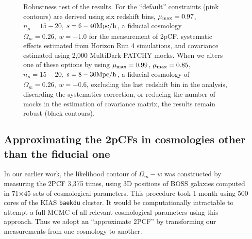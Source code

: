 \documentclass[iop]{emulateapj}
\begin{document}
\begin{figure}
   \caption{\label{fig_contest}
   Robustness test of the results.
   For the ``default'' constraints (pink contours) are derived using six redshift bins, 
   $\mu_{\rm max}=0.97$, $n_{\mu}=15-20$, $s=6-40 \rm Mpc/h$,
   a fiducial cosmology $\Omega_m=0.26,\ w=-1.0$ for the measurement of 2pCF,
   systematic effects estimated from Horizon Run 4 simulations, 
   and covariance estimated using 2,000 MultiDark PATCHY mocks.
   When we alters one of these options by using $\mu_{\rm max}=0.99$, 
   $\mu_{\rm max}=0.85$, $n_{\mu}=15-20$, $s=8-30 \rm Mpc/h$, 
   a fiducial cosmology of $\Omega_m=0.26,\ w=-0.6$, 
   excluding the last redshift bin in the analysis, 
   discarding the systematics correction, 
   or reducing the number of mocks in the estimation of covariance matrix,
   the results remain robust (black contours).
   }
\end{figure}

\subsection{Approximating the 2pCFs in cosmologies other than the fiducial one}

In our earlier work\cite{Li2016}, the likelihood contour of $\Omega_m-w$ was constructed by
measuring the 2PCF 3,375 times,
using 3D positions of BOSS galaxies computed in 71$\times$45 sets of cosmological parameters.
This procedure took 1 month using 500 cores of the KIAS {\texttt {baekdu}} cluster.
It would be computationally intractable to attempt a full MCMC of all relevant cosmological parameters using this approach. 
Thus we adopt an ``approximate 2PCF'' by transforming our measurements from one cosmology to another.
\end{document}
